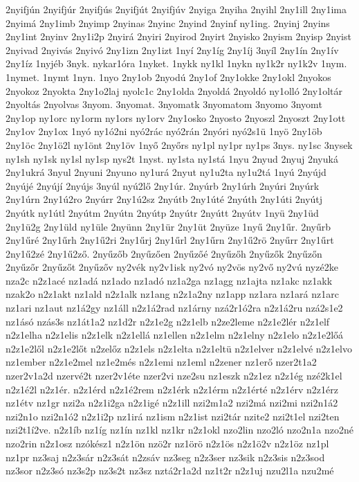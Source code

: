 {2nyifjún
2nyifjúr
2nyifjús
2nyifjút
2nyifjúv
2nyiga
2nyiha
2nyihl
2ny1ill
2ny1ima
2nyimá
2ny1imb
2nyimp
2nyinas
2nyinc
2nyind
2nyinf
ny1ing.
2nyinj
2nyins
2ny1int
2nyinv
2ny1i2p
2nyirá
2nyiri
2nyirod
2nyirt
2nyisko
2nyism
2nyisp
2nyist
2nyivad
2nyivás
2nyivó
2ny1izn
2ny1izt
1nyí
2ny1íg
2ny1íj
3nyíl
2ny1ín
2ny1ív
2ny1íz
1nyjéb
3nyk.
nykar1óra
1nyket.
1nykk
ny1kl
1nykn
ny1k2r
ny1k2v
1nym.
1nymet.
1nymt
1nyn.
1nyo
2ny1ob
2nyodú
2ny1of
2ny1okke
2ny1okl
2nyokos
2nyokoz
2nyokta
2ny1o2laj
nyolc1c
2ny1olda
2nyoldá
2nyoldó
ny1olló
2ny1oltár
2nyoltás
2nyolvas
3nyom.
3nyomat.
3nyomatk
3nyomatom
3nyomo
3nyomt
2ny1op
ny1orc
ny1orm
ny1ors
ny1orv
2ny1osko
2nyosto
2nyoszl
2nyoszt
2ny1ott
2ny1ov
2ny1ox
1nyó
ny1ó2ni
nyó2rác
nyó2rán
2nyóri
nyó2s1ü
1nyö
2ny1öb
2ny1öc
2ny1ö2l
ny1önt
2ny1öv
1nyő
2nyőrs
ny1pl
ny1pr
ny1ps
3nys.
ny1sc
3nysek
ny1sh
ny1sk
ny1sl
ny1sp
nys2t
1nyst.
ny1sta
ny1stá
1nyu
2nyud
2nyuj
2nyuká
2ny1ukrá
3nyul
2nyuni
2nyuno
ny1urá
2nyut
ny1u2ta
ny1u2tá
1nyú
2nyújd
2nyújé
2nyújí
2nyújs
3nyúl
nyú2lő
2ny1úr.
2nyúrb
2ny1úrh
2nyúri
2nyúrk
2ny1úrn
2ny1ú2ro
2nyúrr
2ny1ú2sz
2nyútb
2ny1úté
2nyúth
2ny1úti
2nyútj
2nyútk
ny1útl
2nyútm
2nyútn
2nyútp
2nyútr
2nyútt
2nyútv
1nyü
2ny1üd
2ny1ü2g
2ny1üld
ny1üle
2nyünn
2ny1ür
2ny1üt
2nyüze
1nyű
2ny1űr.
2nyűrb
2ny1űré
2ny1űrh
2ny1ű2ri
2ny1űrj
2ny1űrl
2ny1űrn
2ny1ű2rö
2nyűrr
2ny1űrt
2ny1ű2zé
2ny1ű2ző.
2nyűzőb
2nyűzően
2nyűzőé
2nyűzőh
2nyűzők
2nyűzőn
2nyűzőr
2nyűzőt
2nyűzőv
ny2vék
ny2v1isk
ny2vó
ny2vös
ny2vő
ny2vú
nyzé2ke
nza2c
n2z1acé
nz1adá
nz1ado
nz1adó
nz1a2ga
nz1agg
nz1ajta
nz1akc
nz1akk
nzak2o
n2z1akt
nz1ald
n2z1alk
nz1ang
n2z1a2ny
nz1app
nz1ara
nz1ará
nz1arc
nz1ari
nz1aut
nz1á2gy
nz1áll
n2z1á2rad
nz1árny
nzá2r1ó2ra
n2z1á2ru
nzá2s1e2
nz1ásó
nzás3s
nz1át1a2
nz1d2r
n2z1e2g
n2z1elb
n2ze2leme
n2z1e2lér
n2z1elf
n2z1elha
n2z1elis
n2z1elk
n2z1ellá
nz1ellen
n2z1elm
n2z1elny
n2z1elo
n2z1e2lőá
n2z1e2lől
n2z1e2lőt
n2zelőz
n2z1els
n2z1elta
n2z1eltü
n2z1elver
n2z1elvé
n2z1elvo
nz1ember
n2z1e2mel
nz1e2més
n2z1emi
nz1eml
n2zener
nz1erő
nzer2t1a2
nzer2v1a2d
nzervé2t
nzer2v1éte
nzer2vi
nze2su
nz1eszk
n2z1ez
n2z1ég
nzé2k1el
n2z1é2l
n2z1ér.
n2z1érd
n2z1é2rem
n2z1érk
n2z1érm
n2z1érté
n2z1érv
n2z1érz
nz1étv
nz1gr
nzi2a
n2z1i2ga
n2z1igé
n2z1ill
nzi2m1a2
nzi2má
nzi2mi
nzi2n1á2
nzi2n1o
nzi2n1ó2
n2z1i2p
nz1irá
nz1ism
n2z1ist
nzi2tár
nzite2
nzi2t1el
nzi2ten
nzi2t1í2ve.
n2z1íb
nz1íg
nz1ín
nz1kl
nz1kr
n2z1okl
nzo2lin
nzo2ló
nzo2n1a
nzo2né
nzo2rin
n2z1osz
nzókész1
n2z1ön
nzö2r
nz1örö
n2z1ös
n2z1ö2v
n2z1öz
nz1pl
nz1pr
nz3saj
n2z3sár
n2z3sát
n2zsáv
nz3seg
n2z3ser
nz3sik
n2z3sis
n2z3sod
nz3sor
n2z3só
nz3s2p
nz3s2t
nz3sz
nztá2r1a2d
nz1t2r
n2z1uj
nzu2l1a
nzu2mé
}
